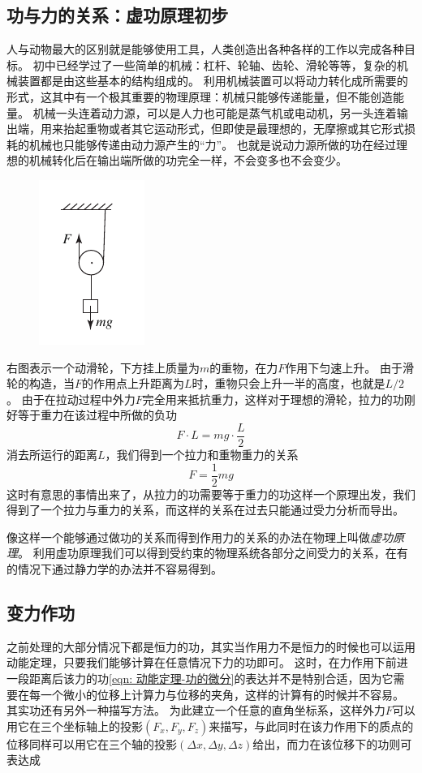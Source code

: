 \subsection{功与力的关系：虚功原理初步}
人与动物最大的区别就是能够使用工具，人类创造出各种各样的工作以完成各种目标。
初中已经学过了一些简单的机械：杠杆、轮轴、齿轮、滑轮等等，复杂的机械装置都是由这些基本的结构组成的。
利用机械装置可以将动力转化成所需要的形式，这其中有一个极其重要的物理原理：机械只能够传递能量，但不能创造能量。
机械一头连着动力源，可以是人力也可能是蒸气机或电动机，另一头连着输出端，用来抬起重物或者其它运动形式，但即使是最理想的，无摩擦或其它形式损耗的机械也只能够传递由动力源产生的“力”。
也就是说动力源所做的功在经过理想的机械转化后在输出端所做的功完全一样，不会变多也不会变少。

\begin{figure}\includegraphics{images/energy-wheal.pdf}\end{figure}
右图表示一个动滑轮，下方挂上质量为$m$的重物，在力$F$作用下匀速上升。
由于滑轮的构造，当$F$的作用点上升距离为$L$时，重物只会上升一半的高度，也就是$L/2$。
由于在拉动过程中外力$F$完全用来抵抗重力，这样对于理想的滑轮，拉力的功刚好等于重力在该过程中所做的负功
\begin{equation}
F\cdot L = mg\cdot\frac{L}{2}
\end{equation}
消去所运行的距离$L$，我们得到一个拉力和重物重力的关系
\begin{equation}
F = \frac{1}{2}mg
\end{equation}
这时有意思的事情出来了，从拉力的功需要等于重力的功这样一个原理出发，我们得到了一个拉力与重力的关系，而这样的关系在过去只能通过受力分析而导出。

像这样一个能够通过做功的关系而得到作用力的关系的办法在物理上叫做\emph{虚功原理}。
利用虚功原理我们可以得到受约束的物理系统各部分之间受力的关系，在有的情况下通过静力学的办法并不容易得到。





\subsection{变力作功}
之前处理的大部分情况下都是恒力的功，其实当作用力不是恒力的时候也可以运用动能定理，只要我们能够计算在任意情况下力的功即可。
这时，在力作用下前进一段距离后该力的功\ref{eqn: 动能定理-功的微分}的表达并不是特别合适，因为它需要在每一个微小的位移上计算力与位移的夹角，这样的计算有的时候并不容易。
其实功还有另外一种描写方法。
为此建立一个任意的直角坐标系，这样外力$F$可以用它在三个坐标轴上的投影$(F_x,F_y,F_z)$来描写，与此同时在该力作用下的质点的位移同样可以用它在三个轴的投影$(\Delta x, \Delta y, \Delta z)$给出，而力在该位移下的功则可表达成

